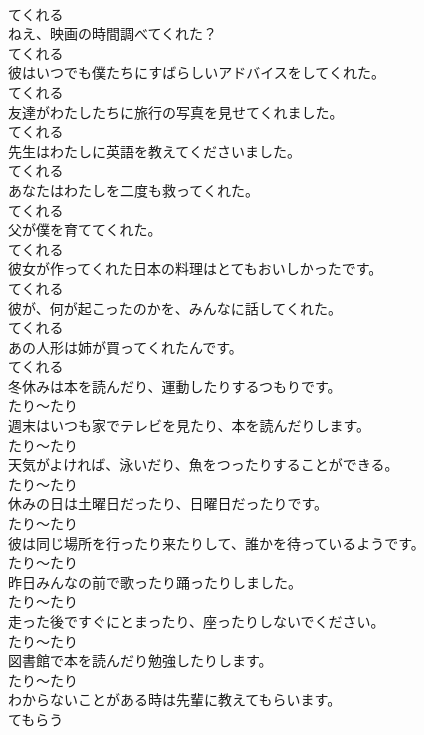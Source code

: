 \documentclass[8pt]{extreport}
\begin{document}
\begin{CJK}{UTF8}{min}
\\	てくれる	
\\	ねえ、映画の時間調べてくれた？	
\\	てくれる	
\\	彼はいつでも僕たちにすばらしいアドバイスをしてくれた。	
\\	てくれる	
\\	友達がわたしたちに旅行の写真を見せてくれました。	
\\	てくれる	
\\	先生はわたしに英語を教えてくださいました。	
\\	てくれる	
\\	あなたはわたしを二度も救ってくれた。	
\\	てくれる	
\\	父が僕を育ててくれた。	
\\	てくれる	
\\	彼女が作ってくれた日本の料理はとてもおいしかったです。	
\\	てくれる	
\\	彼が、何が起こったのかを、みんなに話してくれた。	
\\	てくれる	
\\	あの人形は姉が買ってくれたんです。	
\\	てくれる	
\\	冬休みは本を読んだり、運動したりするつもりです。	
\\	たり～たり	
\\	週末はいつも家でテレビを見たり、本を読んだりします。	
\\	たり～たり	
\\	天気がよければ、泳いだり、魚をつったりすることができる。	
\\	たり～たり	
\\	休みの日は土曜日だったり、日曜日だったりです。	
\\	たり～たり	
\\	彼は同じ場所を行ったり来たりして、誰かを待っているようです。	
\\	たり～たり	
\\	昨日みんなの前で歌ったり踊ったりしました。	
\\	たり～たり	
\\	走った後ですぐにとまったり、座ったりしないでください。	
\\	たり～たり	
\\	図書館で本を読んだり勉強したりします。	
\\	たり～たり	
\\	わからないことがある時は先輩に教えてもらいます。	
\\	てもらう	

\end{CJK}
\end{document}

